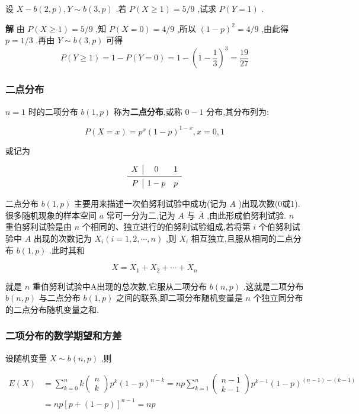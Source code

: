 \begin{example}\label{exam:2.4.2}
	设 $ X-b(2, p), Y \sim b(3, p) $ .若 $ P(X \geqslant 1)=5 / 9 $ ,试求 $ P(Y=1) $ .
	
	\textbf{解} 由 $ P(X \geqslant 1)=5 / 9 $ ,知 $ P(X=0)=4/9 $ ,所以 $ (1-p)^{2}=4/9 $ ,由此得 $ p=1/3 $ .再由 $ Y \sim b(3, p) $ 可得
	\[
	P(Y \geqslant 1)=1-P(Y=0)=1-\left(1-\frac{1}{3}\right)^{3}=\frac{19}{27}
	\]
	
\end{example}

\subsubsection{二点分布}

 $ n=1 $ 时的二项分布 $ b(1,p) $ 称为\textbf{二点分布},或称 $ 0-1 $ 分布,其分布列为:

\begin{equation}
P(X=x)=p^{x}(1-p)^{1-x}, x=0,1 \label{eq:2.4.2}
\end{equation}

或记为

\[
\begin{array}{c|cc}
X     & 0     & 1 \\\midrule
P     & 1-p   & p \\
\end{array}
\]

二点分布 $ b(1,p) $ 主要用来描述一次伯努利试验中成功(记为 $ A $ )出现次数(0或1).
很多随机现象的样本空间 $ a $ 常可一分为二,记为 $ A $ 与 $ \bar{A} $ ,由此形成伯努利试验. $ n $ 重伯努利试验是由 $ n $ 个相同的、独立进行的伯努利试验组成,若将第 $ i $ 个伯努利试验中 $ A $ 出现的次数记为 $ X_{i}(i=1,2, \cdots, n) $ ,则 $ X_i $ 相互独立,且服从相同的二点分布 $ b(1,p) $ .此时其和

\[
X=X_{1}+X_{2}+\cdots+X_{n}
\]

就是 $ n $ 重伯努利试验中A出现的总次数,它服从二项分布 $ b(n,p) $ .这就是二项分布 $ b(n,p) $ 与二点分布 $ b(1,p) $ 之间的联系,即二项分布随机变量是 $ n $ 个独立同分布的二点分布随机变量之和.

\subsubsection{二项分布的数学期望和方差}

设随机变量 $ X \sim b(n, p) $ ,则

\[
\begin{aligned} E(X) &=\sum_{k=0}^{n} k \left( \begin{array}{c}{n} \\ {k}\end{array}\right) p^{k}(1-p)^{n-k}=n p \sum_{k=1}^{n} \left( \begin{array}{c}{n-1} \\ {k-1}\end{array}\right) p^{k-1}(1-p)^{(n-1)-(k-1)} \\ &=n p[p+(1-p)]^{n-1}=n p \end{aligned}
\]

